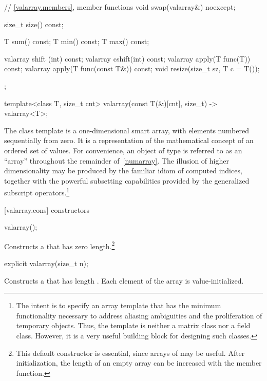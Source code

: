 \begin{codeblock}
{{    // \ref{valarray.members}, member functions
    void swap(valarray&) noexcept;

    size_t size() const;

    T sum() const;
    T min() const;
    T max() const;

    valarray shift (int) const;
    valarray cshift(int) const;
    valarray apply(T func(T)) const;
    valarray apply(T func(const T&)) const;
    void resize(size_t sz, T c = T());
  };

  template<class T, size_t cnt> valarray(const T(&)[cnt], size_t) -> valarray<T>;
}
\end{codeblock}

\pnum
The
class template
is a
one-dimensional smart array, with elements numbered sequentially from zero.
It is a representation of the mathematical concept
of an ordered set of values.
For convenience, an object of type  is referred
to as an ``array'' throughout the remainder of~\ref{numarray}.
The illusion of higher dimensionality
may be produced by the familiar idiom of computed indices, together
with the powerful subsetting capabilities provided
by the generalized subscript operators.\footnote{The intent is to specify
an array template that has the minimum functionality
necessary to address aliasing ambiguities and the proliferation of
temporary objects.
Thus, the
template is neither a
matrix class nor a field class.
However, it is a very useful building block for designing such classes.}

[valarray.cons]{ constructors}

%
\begin{itemdecl}
valarray();
\end{itemdecl}

\begin{itemdescr}
\pnum
\effects
Constructs a 
that has zero length.\footnote{This default constructor is essential,
since arrays of
may be useful.
After initialization, the length of an empty array can be increased with the
member function.}
\end{itemdescr}

%
\begin{itemdecl}
explicit valarray(size_t n);
\end{itemdecl}

\begin{itemdescr}
\pnum
\effects
Constructs a  that has length .
Each element of the array is value-initialized.
\end{itemdescr}

